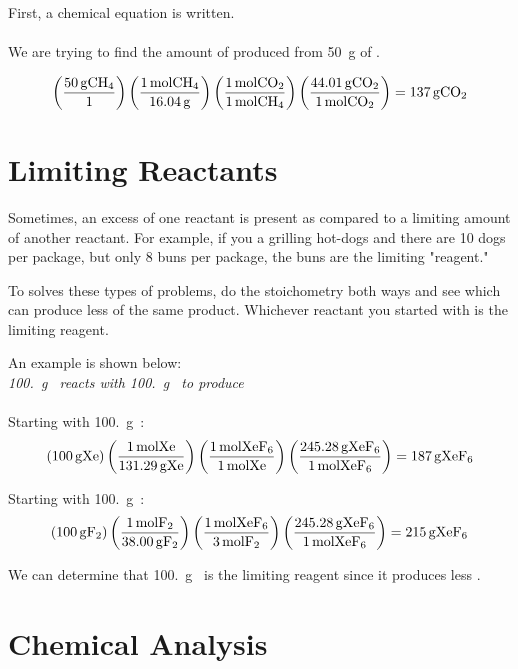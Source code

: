First, a chemical equation is written.\\
\\

We are trying to find the amount of  produced from \SI{50}{\gram} of
.

$$\left(\frac{\SI{50}{\gram} \ce{CH4}}{1}\right)\left(\frac{\SI{1}{\mol}
\ce{CH4}}{\SI{16.04}{\gram}}\right)\left(\frac{\SI{1}{\mol} \ce{CO2}}{\SI{1}{\mol}
\ce{CH4}}\right)\left(\frac{\SI{44.01}{\gram} \ce{CO2}}{\SI{1}{\mol}
\ce{CO2}}\right) = \SI{137}{\gram} \ce{CO2}$$

\section{Limiting Reactants}
Sometimes, an excess of one reactant is present as compared to a limiting
amount of another reactant. For example, if you a grilling hot-dogs and there
are 10 dogs per package, but only 8 buns per package, the buns are the limiting
"reagent."

To solves these types of problems, do the stoichometry both ways and see which
can produce less of the same product. Whichever reactant you started with is the
limiting reagent.

An example is shown below:\\

\textit{\SI{100.}{\gram {}} reacts with \SI{100.}{\gram {}} to produce
}\\

\\

Starting with \SI{100.}{\gram {}}:
$$\left(\SI{100.}{\gram \ce{Xe}}\right)\left(\frac{\SI{1}{\mol
\ce{Xe}}}{\SI{131.29}{\gram \ce{Xe}}}\right)\left(\frac{\SI{1}{\mol
\ce{XeF6}}}{\SI{1}{\mol \ce{Xe}}}\right)\left(\frac{\SI{245.28}{\gram
\ce{XeF6}}}{\SI{1}{\mol \ce{XeF6}}}\right) = \SI{187}{\gram \ce{XeF6}}$$

Starting with \SI{100.}{\gram {}}:
$$\left(\SI{100.}{\gram \ce{F2}}\right)\left(\frac{\SI{1}{\mol
\ce{F2}}}{\SI{38.00}{\gram \ce{F2}}}\right)\left(\frac{\SI{1}{\mol
\ce{XeF6}}}{\SI{3}{\mol \ce{F2}}}\right)\left(\frac{\SI{245.28}{\gram
\ce{XeF6}}}{\SI{1}{\mol \ce{XeF6}}}\right) = \SI{215}{\gram \ce{XeF6}}$$

We can determine that \SI{100.}{\gram {}} is the limiting reagent since it
produces less .

\section{Chemical Analysis}
